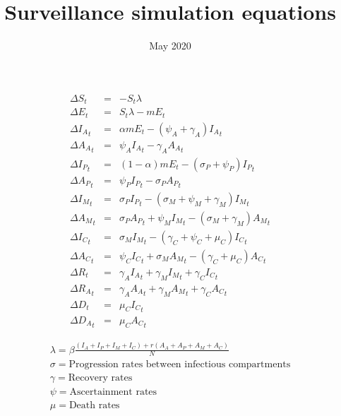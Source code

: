 \documentclass{article}
\title{Surveillance simulation equations}
\date{May 2020}
\begin{document}
\maketitle


\begin{eqnarray}
\Delta S_{t} &=&  - S_{t} \lambda \\
\Delta  E_{t} &=&  S_t \lambda - m E_{t} \\
\Delta  {I_A}_{t}&=&  \alpha m E_{t} -  (\psi_A + \gamma_A) {I_A}_{t}\\
\Delta  {A_A}_{t}  &=&  \psi_A {I_A}_{t} - {\gamma_A} {A_{A}}_{t}\\
\Delta  {I_P}_{t}  &=&  (1 - \alpha) m E_{t} - (\sigma_P + \psi_P) {I_P}_{t} \\
\Delta  {A_P}_{t} &=&  \psi_P {I_P}_{t} - {\sigma_P} {A_{P}}_{t}\\
\Delta  {I_M}_{t} &=& \sigma_P {I_P}_{t} - (\sigma_M + \psi_M + \gamma_M) {I_M}_{t} \\
\Delta  {A_M}_{t} &=&  {\sigma_P} {A_{P}}_{t} + \psi_M {I_M}_{t} - ({\sigma_{M}} + {\gamma_M}){A_{M}}_{t}\\
\Delta  {I_C}_{t}  &=&  \sigma_M {I_M}_{t} - (\gamma_C + \psi_C + \mu_C){I_C}_{t}\\ 
\Delta  {A_C}_{t}  &=&  \psi_C {I_C}_{t} + {\sigma_M} {A_{M}}_{t} - ({\gamma_C} + {\mu_C}) {A_{C}}_{t}\\
\Delta  {R}_{t}  &=&  \gamma_A {I_A}_{t} + \gamma_M {I_M}_{t} + \gamma_C {I_C}_{t}\\
\Delta  {R_A}_{t}  &=&  {\gamma_A} {A_{A}}_{t} + {\gamma_M} {A_{M}}_{t} + {\gamma_C} {A_{C}}_{t}\\
\Delta  D_{t}  &=&  \mu_C {I_C}_{t} \\
\Delta  {D_A}_{t}  &=&  {\mu_C} {A_{C}}_{t}
\end{eqnarray}


\begin{gather}
\lambda  =  \beta \frac{(I_A + I_P + I_M + I_C) + r (A_{A} + A_{P} + A_{M} + A_{C})}{N} \\
\sigma  =  \text{Progression rates between infectious compartments}\\
\gamma  =  \text{Recovery rates}\\
\psi  =  \text{Ascertainment rates}\\
\mu  =  \text{Death rates}\\
\end{gather}
\end{document}
